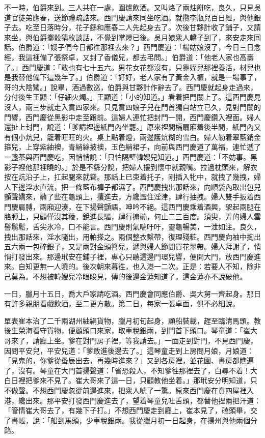 不一時，伯爵來到。三人共在一處，圍爐飲酒。又叫烙了兩炷餅吃，良久，只見吳道官徒弟應春，送節禮疏誥來。西門慶請來同坐吃酒。就攬李瓶兒百日經，與他銀子去。吃至日落時分，花子繇和應春二人先起身去了。次後甘夥計收了鋪子，又請來坐，與伯爵擲骰猜枚談話，不覺到掌燈已後。吳月娘衆人轎子到了，來安走來囘話。伯爵道：「嫂子們今日都徃那裡去來？」西門慶道：「楊姑娘沒了，今日三日念經，我這裡備了張祭卓，又封了香儀兒，都去弔問。」伯爵道：「他老人家也高壽了。」西門慶道：「敢也有七十五六。男花女花都沒有，只靠姪兒那裡養活，材兒也是我替他備下這幾年了。」伯爵道：「好好，老人家有了黃金入櫃，就是一場事了，哥的大陰騭。」說畢，酒過數巡，伯爵與甘夥計作辭去了。西門慶就起身走過來，分付後生王顯：「仔細火燭。」王顯道：「小的知道。」看着把門關上了。這西門慶見沒人，兩三步就走入賁四家來。只見賁四娘子兒在門首獨自站立已久，見對門關的門響，西門慶從黑影中走至跟前。這婦人連忙把封門一開，西門慶鑽入裡面。婦人還扯上封門，說道：「爹請裡邊紙門內坐罷。」原來裡間槅扇廂着後半間，紙門內又有個小炕兒，籠着旺旺的火。桌上點着燈，兩邊護炕糊的雪白。婦人勒着翠藍銷金箍兒，上穿紫紬襖，青綃絲披襖，玉色綃裙子，向前與西門慶道了萬福，連忙遞了一盞茶與西門慶吃，因悄悄說：「只怕隔壁韓嫂兒知道。」西門慶道：「不妨事。黑影子裡他那裡曉的。」{}於是不繇分說，把婦人摟到懷中就親嘴。拉過枕頭來，解衣按在炕沿子上，扛起腿來就聳。那話上已束着托子，剛插入牝中，就拽了幾拽，婦人下邊淫水直流，把一條藍布褲子都濕了。西門慶拽出那話來，向順袋內取出包兒顫聲嬌來，蘸了些在龜頭上，攮進去，方纔澀住淫津，肆行抽拽。婦人雙手扳着西門慶肩膊，兩廂迎湊，在下揚聲顫語，呻吟不絕。這西門慶乘着酒興，架起兩腿在胳膊上，只顧僅沒其稜，銳進長驅，肆行搧磞，何止二三百度。須臾，弄的婦人雲髻鬅鬆，舌尖氷冷，口不能言。西門慶則氣喘吁吁，靈龜暢美，一泄如注。良久，拽出那話來，淫水隨出，用帕搽之。兩個整衣繫帶，復理殘粧。西門慶向袖中掏出五六兩一包碎銀子，又是兩對金頭簪兒，遞與婦人節間買花翠帶。婦人拜謝了，悄悄打發出來。那邊玳安在鋪子裡，專心只聽這邊門環兒響，便開大門，放西門慶進來。自知更無一人曉的。後次朝來暮徃，也入港一二次。正是：若要人不知，除非己莫為。不想被韓嫂兒冷眼睃見，傳的後邊金蓮知道了。這金蓮亦不說破他。

一日，臘月十五日，喬大戶家請吃酒。西門慶會同應伯爵、吳大舅一齊起身。那日有許多親朋看戲飲酒，至二更方散。第二日，每家一張卓面，俱不必細說。

單表崔本治了二千兩湖州紬絹貨物，臘月初旬起身，顧船裝載，趕至臨清馬頭。教後生榮海看守貨物，便顧頭口來家，取車稅銀兩，到門首下頭口。琴童道：「崔大哥來了，請廳上坐。爹在對門房子裡，等我請去。」一面走到對門，不見西門慶，因問平安兒，平安兒道：「爹敢進後邊去了。」這琴童走到上房問月娘，月娘道：「見鬼的，你爹從蚤辰出去，再幾時進來？」又到各房裡，並花園、書房都瞧遍了，沒有。琴童在大門首揚聲道：「省恐殺人，不知爹徃那裡去了，白尋不着！大白日裡把爹來不見了。崔大哥來了這一日，只顧教他坐着。」那玳安分明知道，只不做聲。{}不想西門慶忽從前邊進來，把衆人唬了一驚。原來西門慶在賁四屋裡入港，纔出來。那平安打發西門慶進去了，望着琴童兒吐舌頭，都替他捏兩把汗道：「管情崔大哥去了，有幾下子打。」不想西門慶走到廳上，崔本見了，磕頭畢，交了書帳，說：「船到馬頭，少車稅銀兩。我從臘月初一日起身，在揚州與他兩個分路。


